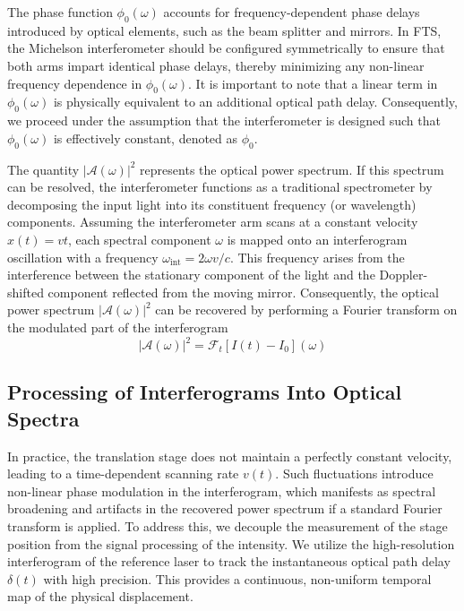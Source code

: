 \documentclass[8pt,a4paper]{report}
\begin{document}
	The phase function $\phi_0(\omega)$ accounts for frequency-dependent phase delays introduced by optical elements, such as the beam splitter and mirrors. In FTS, the Michelson interferometer should be configured symmetrically to ensure that both arms impart identical phase delays, thereby minimizing any non-linear frequency dependence in $\phi_0(\omega)$. It is important to note that a linear term in $\phi_0(\omega)$ is physically equivalent to an additional optical path delay. Consequently, we proceed under the assumption that the interferometer is designed such that $\phi_0(\omega)$ is effectively constant, denoted as $\phi_0$.
	
	The quantity $|\mathcal{A}(\omega)|^2$ represents the optical power spectrum. If this spectrum can be resolved, the interferometer functions as a traditional spectrometer by decomposing the input light into its constituent frequency (or wavelength) components. Assuming the interferometer arm scans at a constant velocity $x(t) = vt$, each spectral component $\omega$ is mapped onto an interferogram oscillation with a frequency $\omega_\mathrm{int} = 2\omega v/c$. This frequency arises from the interference between the stationary component of the light and the Doppler-shifted component reflected from the moving mirror. Consequently, the optical power spectrum $|\mathcal{A}(\omega)|^2$ can be recovered by performing a Fourier transform on the modulated part of the interferogram
	\begin{equation}
		\left|\mathcal{A}(\omega)\right|^2 = \mathcal{F}_t\left[I(t) - I_0\right](\omega)
	\end{equation}
	
	\subsection{Processing of Interferograms Into Optical Spectra}
	
	In practice, the translation stage does not maintain a perfectly constant velocity, leading to a time-dependent scanning rate $v(t)$. Such fluctuations introduce non-linear phase modulation in the interferogram, which manifests as spectral broadening and artifacts in the recovered power spectrum if a standard Fourier transform is applied. To address this, we decouple the measurement of the stage position from the signal processing of the intensity. We utilize the high-resolution interferogram of the reference laser to track the instantaneous optical path delay $\delta(t)$ with high precision. This provides a continuous, non-uniform temporal map of the physical displacement.
	
\end{document}
